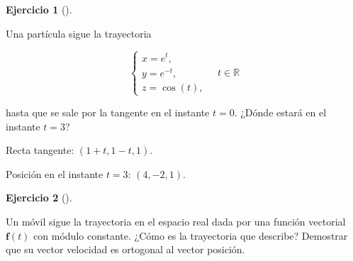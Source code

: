 \documentclass[
  spanish,
  a4paper,
]{scrreport}
\theoremstyle{definition}
\newtheorem{exercise}{Ejercicio}[chapter]
\theoremstyle{remark}
\begin{document}
\begin{exercise}[]\protect\hypertarget{exr-cinematica-tangente-trayectoria-espacio}{}\label{exr-cinematica-tangente-trayectoria-espacio}

Una partícula sigue la trayectoria

\[
\begin{cases}
x=e^t,\\
y=e^{-t},\\
z=\cos(t),
\end{cases}
\quad t\in \mathbb{R}
\]

hasta que se sale por la tangente en el instante \(t=0\). ¿Dónde estará
en el instante \(t=3\)?

\end{exercise}

\begin{tcolorbox}[enhanced jigsaw, arc=.35mm, bottomrule=.15mm, bottomtitle=1mm, breakable, colback=white, colbacktitle=quarto-callout-tip-color!10!white, colframe=quarto-callout-tip-color-frame, coltitle=black, left=2mm, leftrule=.75mm, opacityback=0, opacitybacktitle=0.6, rightrule=.15mm, title=\textcolor{quarto-callout-tip-color}{\faLightbulb}\hspace{0.5em}{Solución}, titlerule=0mm, toprule=.15mm, toptitle=1mm]

Recta tangente: \((1+t,1-t,1)\).

Posición en el instante \(t=3\): \((4,-2,1)\).

\end{tcolorbox}

\begin{exercise}[]\protect\hypertarget{exr-derivadas-función-modulo-constante}{}\label{exr-derivadas-función-modulo-constante}

Un móvil sigue la trayectoria en el espacio real dada por una función
vectorial \(\mathbf{f}(t)\) con módulo constante. ¿Cómo es la
trayectoria que describe? Demostrar que su vector velocidad es ortogonal
al vector posición.

\end{exercise}
\end{document}
